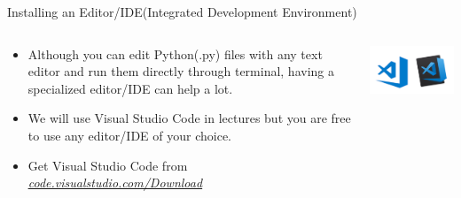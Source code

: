 		\begin{frame}[t]{Installing an Editor/IDE(Integrated Development Environment)}
			\vspace{-4mm}
			\begin{columns}[t] 
				\begin{column}[t]{0.66\linewidth}
					\LARGE
					\begin{itemize}
						\item Although you can edit Python(.py) files with any text editor and run them directly through terminal, having a specialized editor/IDE can help a lot. 
						\item We will use Visual Studio Code in lectures but you are free to use any editor/IDE of your choice.
						\item Get Visual Studio Code from \href{https://code.visualstudio.com/Download}{\underline{\textit{code.visualstudio.com/Download}}}
					\end{itemize}
				\end{column}
				
				\begin{column}{0.33\linewidth}
					\begin{center}
						\includegraphics[width=0.8\linewidth]{images/vscode.png}						
					\end{center}
				\end{column}
			\end{columns}
	 	\end{frame}

